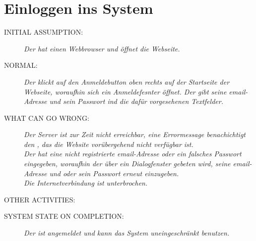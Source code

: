 \section{Einloggen ins System}
\begin{description}
  \item [INITIAL ASSUMPTION:]
    \textit{Der   hat einen Webbrowser und öffnet die Webseite.}
  \item [NORMAL:]
    \textit{Der   klickt auf den Anmeldebutton oben rechts auf der Startseite der Webseite, woraufhin sich ein Anmeldefesnter öffnet. Der   gibt seine email-Adresse und sein Passwort ind die dafür vorgesehenen Textfelder.}
  \item [WHAT CAN GO WRONG:]
    \textit{Der Server ist zur Zeit nicht erreichbar, eine Errormessage benachichtigt den  , das die Website vorübergehend nicht verfügbar ist.\\
Der  hat eine nicht registrierte email-Adresse oder ein falsches Passwort eingegeben, woraufhin der  über ein Dialogfenster gebeten wird, seine email-Adresse und oder sein Passwort erneut einzugeben.\\
Die Internetverbindung ist unterbrochen.}
  \item [OTHER ACTIVITIES:]
    \textit{}
  \item [SYSTEM STATE ON COMPLETION:]
    \textit{Der  ist angemeldet und kann das System uneingeschränkt benutzen.}
\end{description}

